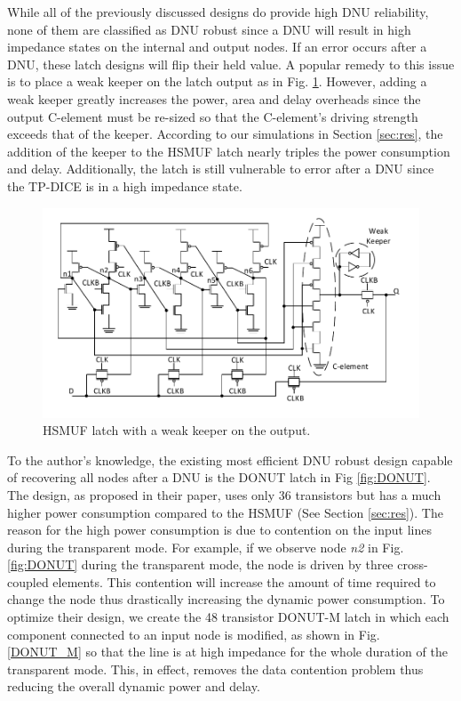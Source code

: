 While all of the previously discussed designs do provide high DNU reliability, none of them are classified as DNU robust since a DNU will result in high impedance states on the internal and output nodes. If an error occurs after a DNU, these latch designs will flip their held value. A popular remedy to this issue is to place a weak keeper on the latch output as in Fig. \ref{HSMUF_fig}. However, adding a weak keeper greatly increases the power, area and delay overheads since the output C-element must be re-sized so that the C-element's driving strength exceeds that of the keeper. According to our simulations in Section \ref{sec:res}, the addition of the keeper to the HSMUF latch nearly triples the power consumption and delay. Additionally, the latch is still vulnerable to error after a DNU since the TP-DICE is in a high impedance state.

\begin{figure}[!htbp]
\centering
\includegraphics[width=\linewidth]{Figures/HSMUF}
\caption{HSMUF latch \cite{HSMUF} with a weak keeper on the output.}
\label{HSMUF_fig}
\end{figure}

To the author's knowledge, the existing most efficient DNU robust design capable of recovering all nodes after a DNU is the DONUT latch \cite{DONUT} in Fig \ref{fig:DONUT}. The design, as proposed in their paper, uses only 36 transistors but has a much higher power consumption compared to the HSMUF (See Section \ref{sec:res}). The reason for the high power consumption is due to contention on the input lines during the transparent mode. For example, if we observe node \textit{n2} in Fig. \ref{fig:DONUT} during the transparent mode, the node is driven by three cross-coupled elements. This contention will increase the amount of time required to change the node thus drastically increasing the dynamic power consumption. To optimize their design, we create the 48 transistor DONUT-M latch in which each component connected to an input node is modified, as shown in Fig. \ref{DONUT_M} so that the line is at high impedance for the whole duration of the transparent mode. This, in effect, removes the data contention problem thus reducing the overall dynamic power and delay.  

